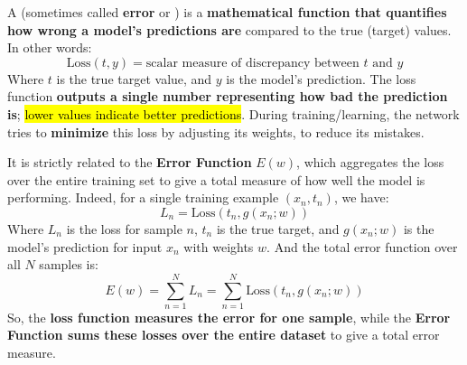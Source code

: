 \begin{definitionbox}
    A  (sometimes called \textbf{error} or ) is a \textbf{mathematical function that quantifies how wrong a model's predictions are} compared to the true (target) values. In other words:
    \begin{equation}
        \text{Loss}(t, y) = \text{scalar measure of discrepancy between } t \text{ and } y
    \end{equation}
    Where $t$ is the true target value, and $y$ is the model's prediction. The loss function \textbf{outputs a single number representing how bad the prediction is}; \hl{lower values indicate better predictions}. During training/learning, the network tries to \textbf{minimize} this loss by adjusting its weights, to reduce its mistakes.

    \highspace
    It is strictly related to the \textbf{Error Function} $E(w)$, which aggregates the loss over the entire training set to give a total measure of how well the model is performing. Indeed, for a single training example $\left(x_{n}, t_{n}\right)$, we have:
    \begin{equation}
        L_{n} = \text{Loss}\left(t_{n}, g\left(x_{n}; w\right)\right)
    \end{equation}
    Where $L_{n}$ is the loss for sample $n$, $t_{n}$ is the true target, and $g\left(x_{n}; w\right)$ is the model's prediction for input $x_{n}$ with weights $w$. And the total error function over all $N$ samples is:
    \begin{equation*}
        E(w) = \displaystyle\sum_{n=1}^{N} L_{n} = \displaystyle\sum_{n=1}^{N} \text{Loss}\left(t_{n}, g\left(x_{n}; w\right)\right)
    \end{equation*}
    So, the \textbf{loss function measures the error for one sample}, while the \textbf{Error Function sums these losses over the entire dataset} to give a total error measure.
\end{definitionbox}

